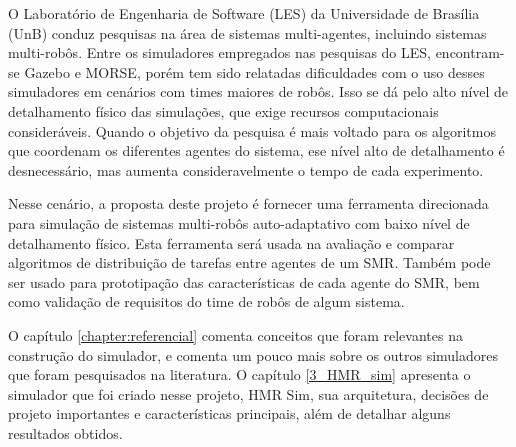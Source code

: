 O Laboratório de Engenharia de Software (LES) da Universidade de Brasília (UnB) conduz pesquisas na área de sistemas multi-agentes, incluindo sistemas multi-robôs. Entre os simuladores empregados nas pesquisas do LES, encontram-se Gazebo e MORSE, porém tem sido relatadas dificuldades com o uso desses simuladores em cenários com times maiores de robôs. Isso se dá pelo alto nível de detalhamento físico das simulações, que exige recursos computacionais consideráveis. Quando o objetivo da pesquisa é mais voltado para os algoritmos que coordenam os diferentes agentes do sistema, ese nível alto de detalhamento é desnecessário, mas aumenta consideravelmente o tempo de cada experimento.

Nesse cenário, a proposta deste projeto é fornecer uma ferramenta direcionada para simulação de sistemas multi-robôs auto-adaptativo com baixo nível de detalhamento físico. Esta ferramenta será usada na avaliação e comparar algoritmos de distribuição de tarefas entre agentes de um SMR. Também pode ser usado para prototipação das características de cada agente do SMR, bem como validação de requisitos do time de robôs de algum sistema.

O capítulo \ref{chapter:referencial} comenta conceitos que foram relevantes na construção do simulador, e comenta um pouco mais sobre os outros simuladores que foram pesquisados na literatura. O capítulo \ref{3_HMR_sim} apresenta o simulador que foi criado nesse projeto, HMR Sim, sua arquitetura, decisões de projeto importantes e características principais, além de detalhar alguns resultados obtidos.


